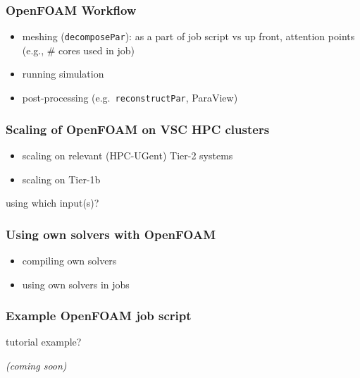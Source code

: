 \subsubsection{OpenFOAM Workflow}

\begin{itemize}
\item meshing (\texttt{decomposePar}): as a part of job script vs up front, attention points (e.g., \# cores used in job)
\item running simulation
\item post-processing (e.g.\ \texttt{reconstructPar}, ParaView)
\end{itemize}

\subsubsection{Scaling of OpenFOAM on VSC HPC clusters}

\begin{itemize}
\item scaling on relevant (HPC-UGent) Tier-2 systems
\item scaling on Tier-1b
\end{itemize}

using which input(s)?

\subsubsection{Using own solvers with OpenFOAM}

\begin{itemize}
\item compiling own solvers
\item using own solvers in jobs
\end{itemize}

\subsubsection{Example OpenFOAM job script}

tutorial example?

\textit{(coming soon)}
